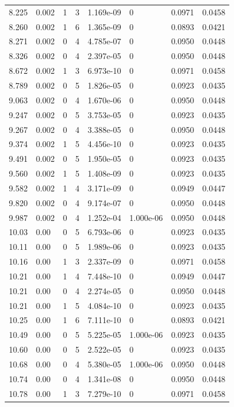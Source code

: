 \documentclass[preview]{standalone}
\begin{document}
{{{\begin{tabular}{L{1.2cm}C{1.2cm} C{0.3cm}C{0.5cm} C{1.4cm}C{1.4cm} C{1.4cm}C{1.4cm}}
  8.225  &  0.002  & 1     &  3 &  1.169e-09  & 0  & 0.0971 &  0.0458   \\ 
  8.260  &  0.002  & 1     &  6 &  1.365e-09  & 0  & 0.0893 &  0.0421   \\ 
  8.271  &  0.002  & 0     &  4 &  4.785e-07  & 0  & 0.0950 &  0.0448   \\ 
  8.326  &  0.002  & 0     &  4 &  2.397e-05  & 0  & 0.0950 &  0.0448   \\ 
  8.672  &  0.002  & 1     &  3 &  6.973e-10  & 0  & 0.0971 &  0.0458   \\ 
  8.789  &  0.002  & 0     &  5 &  1.826e-05  & 0  & 0.0923 &  0.0435   \\ 
  9.063  &  0.002  & 0     &  4 &  1.670e-06  & 0  & 0.0950 &  0.0448   \\ 
  9.247  &  0.002  & 0     &  5 &  3.753e-05  & 0  & 0.0923 &  0.0435   \\ 
  9.267  &  0.002  & 0     &  4 &  3.388e-05  & 0  & 0.0950 &  0.0448   \\ 
  9.374  &  0.002  & 1     &  5 &  4.456e-10  & 0  & 0.0923 &  0.0435   \\ 
  9.491  &  0.002  & 0     &  5 &  1.950e-05  & 0  & 0.0923 &  0.0435   \\ 
  9.560  &  0.002  & 1     &  5 &  1.408e-09  & 0  & 0.0923 &  0.0435   \\ 
  9.582  &  0.002  & 1     &  4 &  3.171e-09  & 0  & 0.0949 &  0.0447   \\ 
  9.820  &  0.002  & 0     &  4 &  9.174e-07  & 0  & 0.0950 &  0.0448   \\ 
  9.987  &  0.002  & 0     &  4 &  1.252e-04  & 1.000e-06  & 0.0950 &  0.0448   \\ 
  10.03  &  0.00  & 0     &  5 &  6.793e-06  & 0  & 0.0923 &  0.0435   \\ 
  10.11  &  0.00  & 0     &  5 &  1.989e-06  & 0  & 0.0923 &  0.0435   \\ 
  10.16  &  0.00  & 1     &  3 &  2.337e-09  & 0  & 0.0971 &  0.0458   \\ 
  10.21  &  0.00  & 1     &  4 &  7.448e-10  & 0  & 0.0949 &  0.0447   \\ 
  10.21  &  0.00  & 0     &  4 &  2.274e-05  & 0  & 0.0950 &  0.0448   \\ 
  10.21  &  0.00  & 1     &  5 &  4.084e-10  & 0  & 0.0923 &  0.0435   \\ 
  10.25  &  0.00  & 1     &  6 &  7.111e-10  & 0  & 0.0893 &  0.0421   \\ 
  10.49  &  0.00  & 0     &  5 &  5.225e-05  & 1.000e-06  & 0.0923 &  0.0435   \\ 
  10.60  &  0.00  & 0     &  5 &  2.522e-05  & 0  & 0.0923 &  0.0435   \\ 
  10.68  &  0.00  & 0     &  4 &  5.380e-05  & 1.000e-06  & 0.0950 &  0.0448   \\ 
  10.74  &  0.00  & 0     &  4 &  1.341e-08  & 0  & 0.0950 &  0.0448   \\ 
  10.78  &  0.00  & 1     &  3 &  7.279e-10  & 0  & 0.0971 &  0.0458   \\ 
\hline 
\end{tabular} 

}}}
\end{document}
